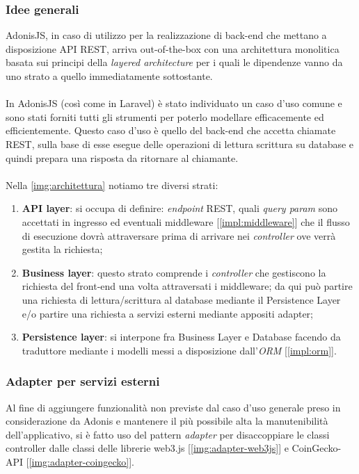         \subsubsection{Idee generali}
        AdonisJS, in caso di utilizzo per la realizzazione di back-end che mettano a disposizione API REST, arriva out-of-the-box con una architettura monolitica basata sui principi della \textit{layered architecture} per i quali le dipendenze vanno da uno strato a quello immediatamente sottostante.
        \\\\
        In AdonisJS (così come in Laravel) è stato individuato un caso d'uso comune e sono stati forniti tutti gli strumenti per poterlo modellare efficacemente ed efficientemente. Questo caso d'uso è quello del back-end che accetta chiamate REST, sulla base di esse esegue delle operazioni di lettura scrittura su database e quindi prepara una risposta da ritornare al chiamante.
        \\\\
        Nella \autoref{img:architettura} notiamo tre diversi strati:
        \begin{enumerate}
            \item \textbf{API layer}: si occupa di definire: \textit{endpoint} REST, quali \textit{query param} sono accettati in ingresso ed eventuali middleware [\autoref{impl:middleware}] che il flusso di esecuzione dovrà attraversare prima di arrivare nei \textit{controller} ove verrà gestita la richiesta;
            \item \textbf{Business layer}: questo strato comprende i \textit{controller} che gestiscono la richiesta del front-end una volta attraversati i middleware; da qui può partire una richiesta di lettura/scrittura al database mediante il Persistence Layer e/o partire una richiesta a servizi esterni mediante appositi adapter;
            \item \textbf{Persistence layer}: si interpone fra Business Layer e Database facendo da traduttore mediante i modelli messi a disposizione dall'\textit{ORM} [\autoref{impl:orm}].
        \end{enumerate}

        \subsubsection{Adapter per servizi esterni}
        Al fine di aggiungere funzionalità non previste dal caso d'uso generale preso in considerazione da Adonis e mantenere il più possibile alta la manutenibilità dell'applicativo, si è fatto uso del pattern \textit{adapter} per disaccoppiare le classi controller dalle classi delle librerie web3.js [\autoref{img:adapter-web3js}] e CoinGecko-API [\autoref{img:adapter-coingecko}].

